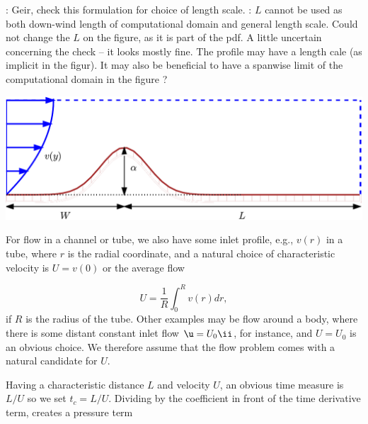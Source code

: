 \documentclass[graybox,envcountchap,sectrefs,final]{svmonodo}
\newcommand{\shortinlinecomment}[3]{{\color{red}{\bf #1}: #2}}
\newcommand{\longinlinecomment}[3]{{\color{red}{\bf #1}: #2}}
\begin{document}
\shortinlinecomment{hpl 20}{ Geir, check this formulation for choice of length scale. }{ Geir, check this formulation }
\longinlinecomment{Geir 21}{ $L$ cannot be used as both down-wind length of computational domain and general length scale. Could not change the $L$ on the figure, as it is part of the pdf. A little uncertain concerning the check -- it looks mostly fine. The profile may have a length cale (as implicit in the figur). It may also be beneficial to have a spanwise limit of the computational domain in the figure ? }{ $L$ cannot be used }



\vspace{3mm}




\vspace{3mm}





\centerline{\includegraphics[width=0.9\linewidth]{fig-scaling/flow_over_gaussian.pdf}}





\vspace{3mm}




\vspace{3mm}



For flow in a channel or tube, we also have some inlet profile, e.g.,
$v(r)$ in a tube, where $r$ is the radial coordinate, and a natural
choice of characteristic velocity is $U=v(0)$ or the average flow

\[ U = \frac{1}{R}\int_0^R v(r)dr,\]
if $R$ is the radius of the tube. Other examples may be flow around
a body, where there is some distant constant inlet flow $\u = U_0\ii$,
for instance, and $U=U_0$ is an obvious choice. We therefore
assume that the flow problem comes with a natural candidate for $U$.

Having a characteristic distance $L$ and velocity $U$, an obvious
time measure is $L/U$ so we set $t_c=L/U$. Dividing by the
coefficient in front of the time derivative term, creates a pressure
term
\end{document}
